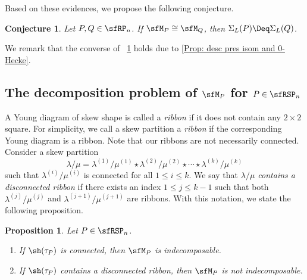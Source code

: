 \documentclass[12pt, reqno]{amsart}
\newtheorem{proposition}[theorem]{Proposition}
\newtheorem{conjecture}[theorem]{Conjecture}
\theoremstyle{definition}
\numberwithin{equation}{section} \numberwithin{figure}{section}
\numberwithin{table}{section}
\begin{document}
Based on these evidences, we propose the following conjecture.

\begin{conjecture}\label{conj: first one}
Let $P, Q \in \sfRP_n$.
If $\sfM_P \cong \sfM_Q$, then $\Sigma_L(P) \Deq \Sigma_L(Q)$.
\end{conjecture}

We remark that the converse of ~\cref{conj: first one} holds due to 
\cref{Prop: desc pres isom and 0-Hecke}.







\subsection{The decomposition problem of $\sfM_P$ for $P \in \sfRSP_n$}\label{subsec: decomp}



A Young diagram of skew shape is called a \emph{ribbon} if it does not contain any $2\times 2$ square. 
For simplicity, we call a skew partition a \emph{ribbon} if the corresponding Young diagram is a ribbon.
Note that our ribbons are not necessarily connected.
Consider a skew partition 
\[
\lambda/\mu = \lambda^{(1)} / \mu^{(1)} \star \lambda^{(2)} / \mu^{(2)} \star \cdots \star \lambda^{(k)} / \mu^{(k)}
\]
such that  $\lambda^{(i)} / \mu^{(i)}$ is connected for all $1 \le i \le k$.
We say that \emph{$\lambda / \mu$ contains a disconnected ribbon} if there exists an index $1 \le j \le k-1$ such that both $\lambda^{(j)} / \mu^{(j)}$ and $\lambda^{(j+1)} / \mu^{(j+1)}$ are ribbons.
With this notation,   we state the following proposition.
\begin{proposition}\label{prop: regard decomp}
Let $P \in \sfRSP_n$.
\begin{enumerate}[label = {\rm (\arabic*)}]
\item If $\sh(\tau_P)$ is connected, then $\sfM_P$ is indecomposable.
\item If $\sh(\tau_P)$ contains a disconnected ribbon, then $\sfM_P$ is not indecomposable.
\end{enumerate}
\end{proposition}
\end{document}
